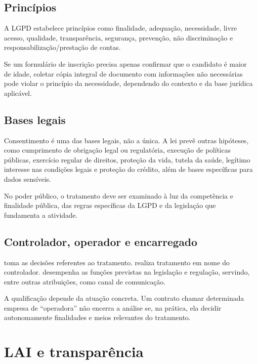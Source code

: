 \subsection{Princípios}

A LGPD estabelece princípios como finalidade, adequação, necessidade, livre acesso, qualidade, transparência, segurança, prevenção, não discriminação e responsabilização/prestação de contas.

\begin{exemplo}[necessidade]
Se um formulário de inscrição precisa apenas confirmar que o candidato é maior de idade, coletar cópia integral de documento com informações não necessárias pode violar o princípio da necessidade, dependendo do contexto e da base jurídica aplicável.
\end{exemplo}

\subsection{Bases legais}

Consentimento é uma das bases legais, não a única. A lei prevê outras hipóteses, como cumprimento de obrigação legal ou regulatória, execução de políticas públicas, exercício regular de direitos, proteção da vida, tutela da saúde, legítimo interesse nas condições legais e proteção do crédito, além de bases específicas para dados sensíveis.

No poder público, o tratamento deve ser examinado à luz da competência e finalidade pública, das regras específicas da LGPD e da legislação que fundamenta a atividade.

\subsection{Controlador, operador e encarregado}

 toma as decisões referentes ao tratamento.  realiza tratamento em nome do controlador.  desempenha as funções previstas na legislação e regulação, servindo, entre outras atribuições, como canal de comunicação.

A qualificação depende da atuação concreta. Um contrato chamar determinada empresa de ``operadora'' não encerra a análise se, na prática, ela decidir autonomamente finalidades e meios relevantes do tratamento.

\section{LAI e transparência}

